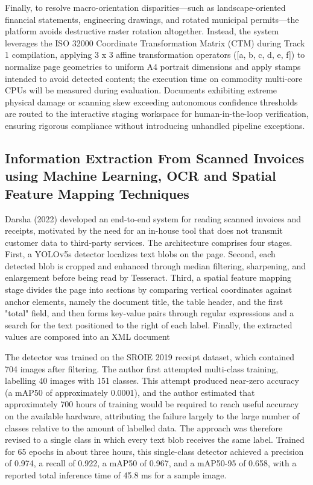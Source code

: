 Finally, to resolve macro-orientation disparities---such as landscape-oriented financial statements, engineering drawings, and rotated municipal permits---the platform avoids destructive raster rotation altogether.
Instead, the system leverages the ISO 32000 Coordinate Transformation Matrix (CTM) during Track 1 compilation, applying 3 x 3 affine transformation operators ([a, b, c, d, e, f]) to normalize page geometries to uniform A4 portrait dimensions and apply stamps intended to avoid detected content; the execution time on commodity multi-core CPUs will be measured during evaluation.
Documents exhibiting extreme physical damage or scanning skew exceeding autonomous confidence thresholds are routed to the interactive staging workspace for human-in-the-loop verification, ensuring rigorous compliance without introducing unhandled pipeline exceptions.

\subsection{Information Extraction From Scanned Invoices using Machine Learning, OCR and Spatial Feature Mapping Techniques}

Darsha (2022) developed an end-to-end system for reading scanned invoices and receipts, motivated by the need for an in-house tool that does not transmit customer data to third-party services.
The architecture comprises four stages.
First, a YOLOv5s detector localizes text blobs on the page.
Second, each detected blob is cropped and enhanced through median filtering, sharpening, and enlargement before being read by Tesseract.
Third, a spatial feature mapping stage divides the page into sections by comparing vertical coordinates against anchor elements, namely the document title, the table header, and the first "total" field, and then forms key-value pairs through regular expressions and a search for the text positioned to the right of each label.
Finally, the extracted values are composed into an XML document \cite{ref53}

The detector was trained on the SROIE 2019 receipt dataset, which contained 704 images after filtering.
The author first attempted multi-class training, labelling 40 images with 151 classes.
This attempt produced near-zero accuracy (a mAP50 of approximately 0.0001), and the author estimated that approximately 700 hours of training would be required to reach useful accuracy on the available hardware, attributing the failure largely to the large number of classes relative to the amount of labelled data.
The approach was therefore revised to a single class in which every text blob receives the same label.
Trained for 65 epochs in about three hours, this single-class detector achieved a precision of 0.974, a recall of 0.922, a mAP50 of 0.967, and a mAP50-95 of 0.658, with a reported total inference time of 45.8 ms for a sample image.

